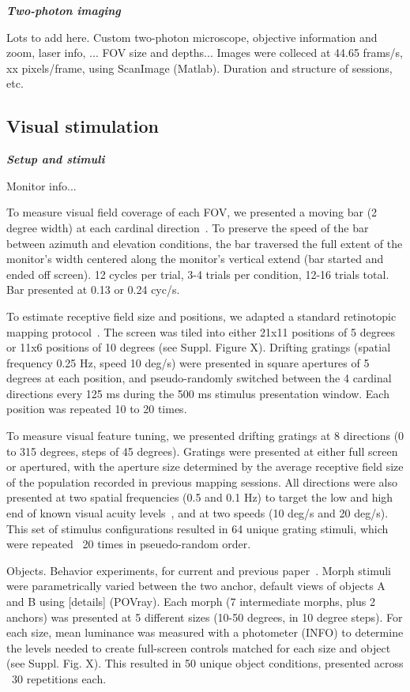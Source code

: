 \documentclass{article}
\begin{document}
\textbf{\textit{Two-photon imaging}}

Lots to add here. Custom two-photon microscope, objective information and zoom, laser info, ...
FOV size and depths... Images were colleced at 44.65 frams/s, xx pixels/frame, using ScanImage (Matlab). 
Duration and structure of sessions, etc.

\subsection{Visual stimulation}

\textbf{\textit{Setup and stimuli}}

Monitor info...

To measure visual field coverage of each FOV, we presented a moving bar (2 degree width) at each cardinal direction~\cite{kalatsky2009}. To preserve the speed of the bar between azimuth and elevation conditions, the bar traversed the full extent of the monitor's width centered along the monitor's vertical extend (bar started and ended off screen). 12 cycles per trial, 3-4 trials per condition, 12-16 trials total. Bar presented at 0.13 or 0.24 cyc/s.

To estimate receptive field size and positions, we adapted a standard retinotopic mapping protocol~\cite{petreanuRF}. The screen was tiled into either 21x11 positions of 5 degrees or 11x6 positions of 10 degrees (see Suppl. Figure X). Drifting gratings (spatial frequency 0.25 Hz, speed 10 deg/s) were presented in square apertures of 5 degrees at each position, and pseudo-randomly switched between the 4 cardinal directions every 125 ms during the 500 ms stimulus presentation window. Each position was repeated 10 to 20 times. 

To measure visual feature tuning, we presented drifting gratings at 8 directions (0 to 315 degrees, steps of 45 degrees). Gratings were presented at either full screen or apertured, with the aperture size determined by the average receptive field size of the population recorded in previous  mapping sessions.  All directions were also presented at two spatial frequencies (0.5 and 0.1 Hz) to target the low and high end of known visual acuity levels~, and at two speeds (10 deg/s and 20 deg/s). This set of stimulus configurations resulted in 64 unique grating stimuli, which were repeated ~20 times in pseuedo-random order.

Objects. Behavior experiments, for current and previous paper~\cite{Zoccolan2009rats}. Morph stimuli were parametrically varied between the two anchor, default views of objects A and B using [details] (POVray). Each morph (7 intermediate morphs, plus 2 anchors) was presented at 5 different sizes (10-50 degrees, in 10 degree steps). For each size, mean luminance was measured with a photometer (INFO) to determine the levels needed to create full-screen controls matched for each size and object (see Suppl. Fig. X). This resulted in 50 unique object conditions, presented across ~30 repetitions each.
\end{document}
